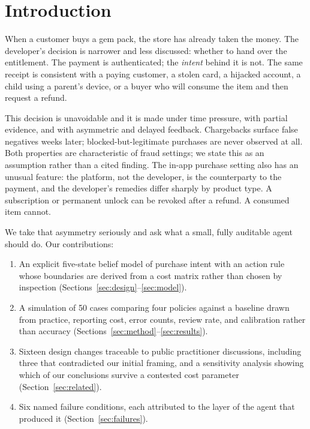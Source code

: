 \documentclass{article}
\begin{document}
\section{Introduction}

When a customer buys a gem pack, the store has already taken the money. The developer's
decision is narrower and less discussed: whether to hand over the entitlement. The payment
is authenticated; the \emph{intent} behind it is not. The same receipt is consistent with a
paying customer, a stolen card, a hijacked account, a child using a parent's device, or a
buyer who will consume the item and then request a refund.

This decision is unavoidable and it is made under time pressure, with partial evidence, and
with asymmetric and delayed feedback. Chargebacks surface false negatives weeks later;
blocked-but-legitimate purchases are never observed at all. Both properties are
characteristic of fraud settings; we state this as an assumption rather than a cited
finding. The in-app purchase setting also has
an unusual feature: the platform, not the developer, is the counterparty to the payment,
and the developer's remedies differ sharply by product type. A subscription or permanent
unlock can be revoked after a refund. A consumed item cannot.

We take that asymmetry seriously and ask what a small, fully auditable agent should do. Our
contributions:

\begin{enumerate}
\item An explicit five-state belief model of purchase intent with an action rule whose
boundaries are derived from a cost matrix rather than chosen by inspection
(Sections~\ref{sec:design}--\ref{sec:model}).
\item A simulation of 50 cases comparing four policies against a baseline drawn from
practice, reporting cost, error counts, review rate, and calibration rather than accuracy
(Sections~\ref{sec:method}--\ref{sec:results}).
\item Sixteen design changes traceable to public practitioner discussions, including three
that contradicted our initial framing, and a sensitivity analysis showing which of our
conclusions survive a contested cost parameter (Section~\ref{sec:related}).
\item Six named failure conditions, each attributed to the layer of the agent that produced
it (Section~\ref{sec:failures}).
\end{enumerate}
\end{document}
